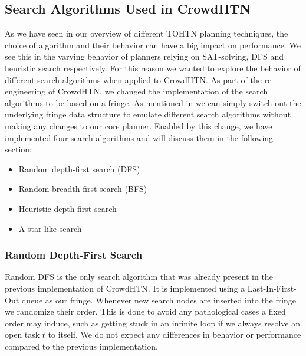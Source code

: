 \subsection{Search Algorithms Used in CrowdHTN}
\label{improv: search algorithms}
As we have seen in our overview of different TOHTN planning techniques, the choice of algorithm and their behavior can have a big impact on performance. We see this in the varying behavior of planners relying on SAT-solving, DFS and heuristic search respectively. For this reason we wanted to explore the behavior of different search algorithms when applied to CrowdHTN.
As part of the re-engineering of CrowdHTN, we changed the implementation of the search algorithms to be based on a fringe. As mentioned in \cite{holler2020htn} we can simply switch out the underlying fringe data structure to emulate different search algorithms without making any changes to our core planner. Enabled by this change, we have implemented four search algorithms and will discuss them in the following section:
\begin{itemize}
	\item Random depth-first search (DFS)
	\item Random breadth-first search (BFS)
	\item Heuristic depth-first search
	\item A-star like search
\end{itemize}

\subsubsection{Random Depth-First Search}
Random DFS is the only search algorithm that was already present in the previous implementation of CrowdHTN. It is implemented using a Last-In-First-Out queue as our fringe. Whenever new search nodes are inserted into the fringe we randomize their order. This is done to avoid any pathological cases a fixed order may induce, such as getting stuck in an infinite loop if we always resolve an open task $t$ to itself. We do not expect any differences in behavior or performance compared to the previous implementation.


